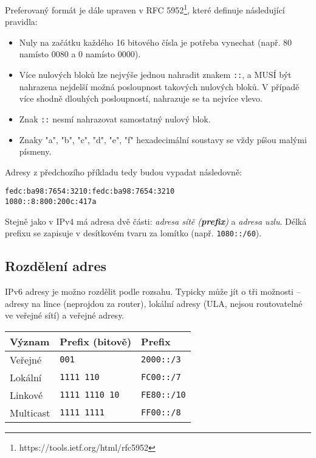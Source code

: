Preferovaný formát je dále upraven v RFC 5952\footnote{https://tools.ietf.org/html/rfc5952}, které definuje následující
pravidla:
\begin{itemize}
    \item Nuly na začátku každého 16 bitového čísla je potřeba vynechat (např.
        80 namísto 0080 a 0 namísto 0000).
    \item Více nulových bloků lze nejvýše jednou nahradit znakem {\tt ::}, a
        MUSÍ být nahrazena nejdelší možná posloupnost takových nulových bloků.
        V případě více shodně dlouhých posloupností, nahrazuje se ta nejvíce
        vlevo.
    \item Znak {\tt ::} nesmí nahrazovat samostatný nulový blok.
    \item Znaky "a", "b", "c", "d", "e", "f" hexadecimální soustavy se vždy
        píšou malými písmeny.
\end{itemize}
Adresy z předchozího příkladu tedy budou vypadat následovně:\\
\begin{verbatim}
fedc:ba98:7654:3210:fedc:ba98:7654:3210
1080::8:800:200c:417a
\end{verbatim}

Stejně jako v IPv4 má adresa dvě části: \emph{adresa sítě ({\bf prefix})} a
\emph{adresa uzlu}. Délká prefixu se zapisuje v desítkovém tvaru za lomítko
(např. {\tt 1080::/60}).

\subsection{Rozdělení adres}
IPv6 adresy je možno rozdělit podle rozsahu. Typicky může jít o tři
možnosti -- adresy na lince (neprojdou za router), lokální adresy (ULA, nejsou
routovatelné ve veřejné sítí) a veřejné adresy.

\begin{table}[ht!]
    \begin{center}
        \begin{tabular}{l|l|l}
            Význam & Prefix (bitově) & Prefix \\
            \hline\hline
            Veřejné  & {\tt 001} & {\tt 2000::/3} \\
            \hline
            Lokální  & {\tt 1111 110} & {\tt FC00::/7} \\
            \hline
            Linkové  & {\tt 1111 1110 10} & {\tt FE80::/10} \\
            \hline
            Multicast & {\tt 1111 1111} & {\tt FF00::/8} \\
            \hline
        \end{tabular}
    \end{center}
\end{table}

